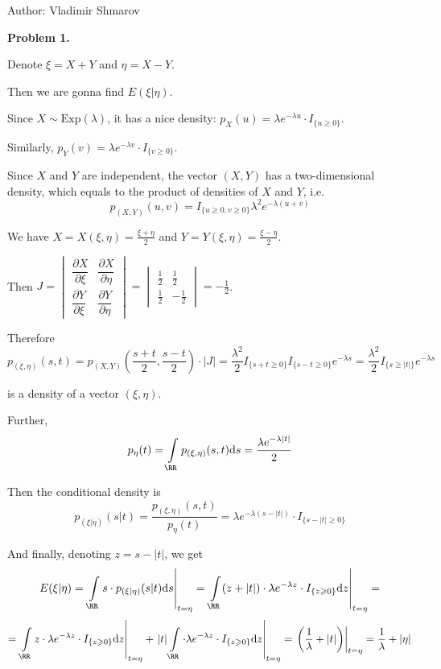 \documentclass[12pt, a4paper]{article}
\newcommand{\ds}{\displaystyle}
\renewcommand{\dz}{\mathrm{d}z}
\begin{document}
Author: Vladimir Shmarov


\textbf{Problem 1.}\par
Denote $\xi = X + Y$ and $\eta = X - Y$.\par
Then we are gonna find  $E(\xi| \eta)$.\par
Since $X \sim \mathrm{Exp}(\lambda)$, it has a nice density: $p_{X}(u) = \lambda e^{-\lambda u}\cdot I_{\{u \geqslant 0\}}$.\par
Similarly, $p_{Y}(v) =  \lambda e^{-\lambda v}\cdot I_{\{v \geqslant 0\}}$.\par
Since $X$ and $Y$ are independent, the vector $(X,Y)$ has a two-dimensional density, which equals to the product of densities of $X$ and $Y$, i.e.
$$
p_{(X,Y)}(u,v) = I_{\{u\geqslant 0, v\geqslant 0\}}\lambda^{2}e^{-\lambda(u+v)}
$$\par
We have $X = X(\xi, \eta) = \frac{\ds \xi + \eta}{\ds 2}$ and $Y = Y(\xi, \eta) = \frac{\ds \xi - \eta}{\ds 2}$.\par
Then $J = \begin{vmatrix}\dfrac{\ds \partial X}{\ds \partial \xi} & \dfrac{\ds \partial X}{\ds \partial \eta}\\ \dfrac{\ds \partial Y}{\ds \partial \xi}& \dfrac{\ds \partial Y}{\ds \partial \eta}
\end{vmatrix} = \begin{vmatrix}\frac{\ds 1}{\ds 2} & \frac{\ds 1}{\ds 2}\\ \frac{\ds 1}{\ds 2}& -\frac{\ds 1}{\ds 2}
\end{vmatrix} = - \frac{\ds 1}{\ds 2}$.\par
Therefore
$$
p_{(\xi, \eta)}(s,t) = p_{(X,Y)}\left(\frac{\ds s+t}{\ds 2}, \frac{\ds s-t}{\ds 2}\right)\cdot |J| = \frac{\ds \lambda^{2}}{\ds 2}I_{\{ s + t \geqslant 0\}}I_{\{s - t \geqslant 0\}}e^{-\lambda s} = \frac{\ds \lambda^{2}}{\ds 2}I_{\{ s \geqslant |t|\}}e^{-\lambda s}
$$
\par
is a density of a vector $(\xi, \eta)$.\par
Further,
$$
p_{\eta}(t) = \int\limits_{\RR}p_{(\xi, \eta)}(s,t)\mathrm{d}s = \frac{\ds \lambda e^{-\lambda|t|}}{\ds 2}
$$\par
Then the conditional density is
$$
p_{(\xi | \eta)}(s|t) = \frac{\ds p_{(\xi, \eta)}(s,t)}{\ds p_{\eta}(t)} = \lambda e^{-\lambda(s-|t|)}\cdot I_{\{s - |t|\geqslant 0\}}
$$\par
And finally, denoting $z = s - |t|$, we get
$$
E(\xi|\eta) = \left.\int\limits_{\RR}s\cdot p_{(\xi|\eta)}(s|t)\mathrm{d}s\right|_{t = \eta} = \left.\int\limits_{\RR}(z + |t|)\cdot\lambda e^{-\lambda z}\cdot I_{\{z\geqslant 0\}}\dz\right|_{t = \eta}  = $$  $$= \left.\int\limits_{\RR}z\cdot\lambda e^{-\lambda z}\cdot I_{\{z\geqslant 0\}}\dz\right|_{t = \eta} + \left.|t|\int\limits_{\RR}\cdot\lambda e^{-\lambda z}\cdot I_{\{z\geqslant 0\}}\dz\right|_{t = \eta} =  \left.\left(\frac{\ds 1}{\ds \lambda} + |t|\right)\right|_{t = \eta} = \frac{\ds 1}{\ds \lambda} + |\eta|
$$\par
\end{document}
